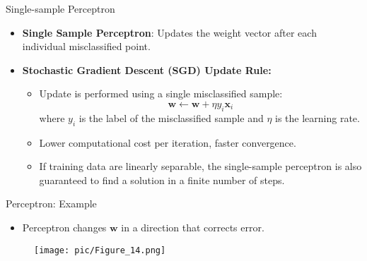 \documentclass[serif, aspectratio=169]{beamer}
\begin{document}
\begin{frame}{Single-sample Perceptron}
    \begin{itemize}\itemsep1.5em
        \item \textbf{Single Sample Perceptron}: Updates the weight vector after each individual misclassified point.
        \item \textbf{Stochastic Gradient Descent (SGD) Update Rule:}
        \smallskip
        \begin{itemize}\itemsep1em
            \item Update is performed using a single misclassified sample:
            \[
            \mathbf{w} \leftarrow \mathbf{w} + \eta y_i \mathbf{x}_i
            \]
            where \( y_i \) is the label of the misclassified sample and \( \eta \) is the learning rate.
            \item Lower computational cost per iteration, faster convergence.
            \item \justifying If training data are linearly separable, the single-sample perceptron is also guaranteed to find a solution in a finite number of steps.
        \end{itemize}
    \end{itemize}
\end{frame}

\begin{frame}{Perceptron: Example}
    \begin{itemize}
        \item Perceptron changes \(\mathbf{w}\) in a direction that corrects error.
    \end{itemize}
    \begin{figure}
        \centering
        \texttt{[image: pic/Figure\_14.png]}
    \end{figure}
\end{frame}
\end{document}
